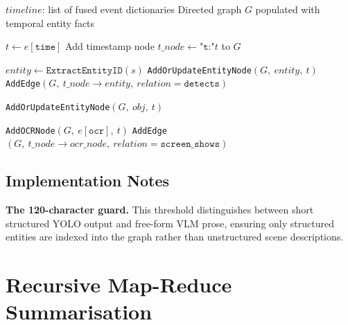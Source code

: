 \begin{algorithm}[H]
\caption{\texttt{TemporalKnowledgeGraph.build\_from\_timeline(timeline)}}
\begin{algbox}
\begin{algorithmic}[1]
\Require $timeline$: list of fused event dictionaries
\Ensure Directed graph $G$ populated with temporal entity facts

    \State $t \gets e[\texttt{time}]$
    \State Add timestamp node $t\_node \gets \texttt{"t:"}t$ to $G$

        \State $entity \gets \texttt{ExtractEntityID}(s)$
            \State \texttt{AddOrUpdateEntityNode}$(G,\ entity,\ t)$
            \State \texttt{AddEdge}$(G,\ t\_node \to entity,\ relation=\texttt{detects})$
        \EndIf
    \EndFor

            \State \texttt{AddOrUpdateEntityNode}$(G,\ obj,\ t)$
        \EndFor
    \EndIf

        \State \texttt{AddOCRNode}$(G,\ e[\texttt{ocr}],\ t)$
        \State \texttt{AddEdge}$(G,\ t\_node \to ocr\_node,\ relation=\texttt{screen\_shows})$
    \EndIf
\EndFor
\end{algorithmic}
\end{algbox}
\end{algorithm}

\subsection{Implementation Notes}

\textbf{The 120-character guard.} This threshold distinguishes between short structured YOLO output and free-form VLM prose, ensuring only structured entities are indexed into the graph rather than unstructured scene descriptions.

\section{Recursive Map-Reduce Summarisation}

